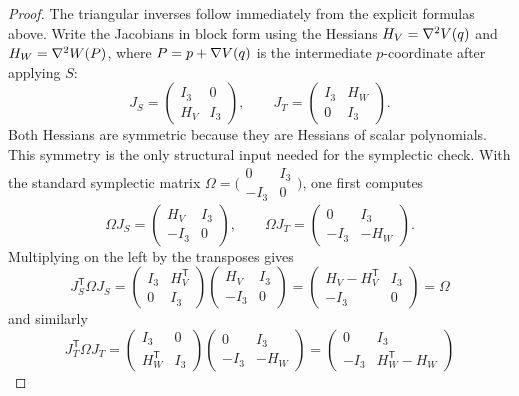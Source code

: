 \documentclass[11pt]{article}
\theoremstyle{remark}
\numberwithin{equation}{section}
\begin{document}
\begin{proof}
The triangular inverses follow immediately from the explicit formulas above.
Write the Jacobians in block form using the Hessians \(H_V=\nabla^2V(q)\)
and \(H_W=\nabla^2W(P)\), where \(P=p+\nabla V(q)\) is the
intermediate \(p\)-coordinate after applying \(S\):
\[
J_S=\begin{pmatrix}I_3&0\\H_V&I_3\end{pmatrix},\qquad
J_T=\begin{pmatrix}I_3&H_W\\0&I_3\end{pmatrix}.
\]
Both Hessians are symmetric because they are Hessians of scalar polynomials.
This symmetry is the only structural input needed for the symplectic check.
With the standard symplectic matrix
\(\Omega=\bigl(\begin{smallmatrix}0&I_3\\-I_3&0\end{smallmatrix}\bigr)\),
one first computes
\[
\Omega J_S=
\begin{pmatrix}
H_V&I_3\\
-I_3&0
\end{pmatrix},
\qquad
\Omega J_T=
\begin{pmatrix}
0&I_3\\
-I_3&-H_W
\end{pmatrix}.
\]
Multiplying on the left by the transposes gives
\[
J_S^{\mathsf T}\Omega J_S
=
\begin{pmatrix}
I_3&H_V^{\mathsf T}\\
0&I_3
\end{pmatrix}
\begin{pmatrix}
H_V&I_3\\
-I_3&0
\end{pmatrix}
=
\begin{pmatrix}
H_V-H_V^{\mathsf T}&I_3\\
-I_3&0
\end{pmatrix}
=\Omega
\]
and similarly
\[
J_T^{\mathsf T}\Omega J_T
=
\begin{pmatrix}
I_3&0\\
H_W^{\mathsf T}&I_3
\end{pmatrix}
\begin{pmatrix}
0&I_3\\
-I_3&-H_W
\end{pmatrix}
=
\begin{pmatrix}
0&I_3\\
-I_3&H_W^{\mathsf T}-H_W
\end{pmatrix}
\]
\end{proof}
\end{document}
